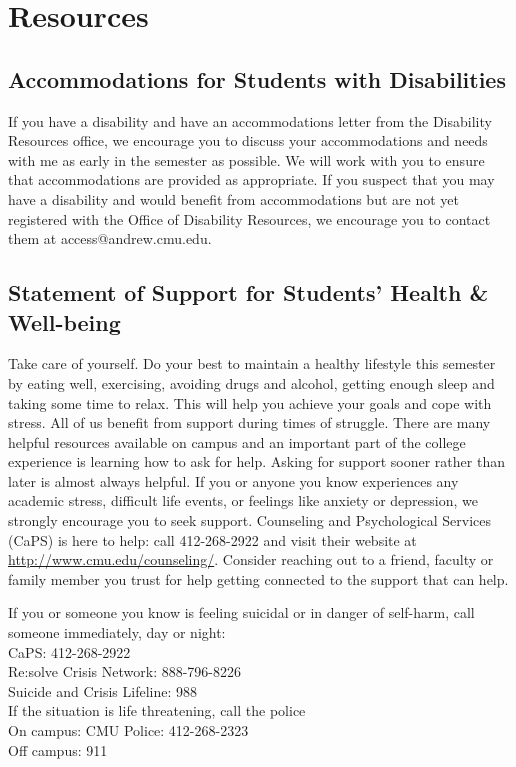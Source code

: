 \section{Resources}

\subsection{Accommodations for Students with Disabilities}

If you have a disability and have an accommodations letter from the Disability Resources office, 
we encourage you to discuss your accommodations and needs with me as early in the semester as possible. 
We will work with you to ensure that accommodations are provided as appropriate. 
If you suspect that you may have a disability and would benefit from accommodations 
but are not yet registered with the Office of Disability Resources, 
we encourage you to contact them at access@andrew.cmu.edu.

\subsection{Statement of Support for Students’ Health \& Well-being}

Take care of yourself.  
Do your best to maintain a healthy lifestyle this semester by eating well, exercising, 
avoiding drugs and alcohol, getting enough sleep and taking some time to relax. 
This will help you achieve your goals and cope with stress.
All of us benefit from support during times of struggle. 
There are many helpful resources available on campus and an important part of the college experience 
is learning how to ask for help. Asking for support sooner rather than later is almost always helpful.
If you or anyone you know experiences any academic stress, difficult life events, or feelings like anxiety or depression,
we strongly encourage you to seek support. 
Counseling and Psychological Services (CaPS) is here to help: 
call 412-268-2922 and visit their website at \url{http://www.cmu.edu/counseling/}. 
Consider reaching out to a friend, faculty or family member you trust 
for help getting connected to the support that can help.

 \begin{tcolorbox}[colback=blue!5,colframe=blue!75!black]
If you or someone you know is feeling suicidal or in danger of self-harm, call someone immediately, day or night:\\

CaPS: 412-268-2922\\
Re:solve Crisis Network: 888-796-8226\\
Suicide and Crisis Lifeline: 988\\ 

If the situation is life threatening, call the police\\
On campus: CMU Police: 412-268-2323\\
Off campus: 911
\end{tcolorbox}

